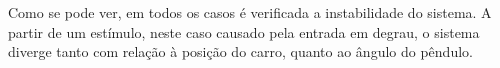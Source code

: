
Como se pode ver, em todos os casos é verificada a instabilidade do sistema. A partir de um estímulo, neste caso causado pela entrada em degrau, o sistema diverge tanto com relação à posição do carro, quanto ao ângulo do pêndulo.





